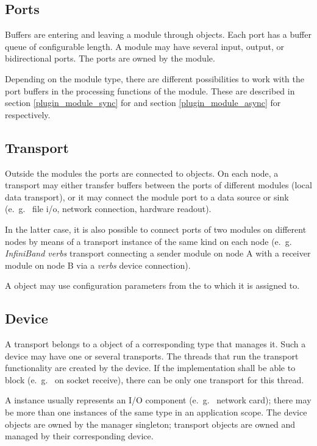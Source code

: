       
\subsection{Ports}
Buffers are entering and leaving a module through 
  objects. 
Each port has a buffer queue of configurable length.
A module may have several input, output,  
or bidirectional ports. The ports are owned by the module.

Depending on the module type, there are different possibilities to
work with the port buffers in the processing functions of the module.
These are described in section \ref{plugin_module_sync} for 
and section \ref{plugin_module_async} for  respectively.
 



\subsection{Transport}
Outside the modules the ports are connected to 
  objects.
On each node, a transport may either transfer buffers between 
the ports of different modules (local data transport), or it may connect the module port to a data 
source or sink (e.~g.~ file i/o, network connection, hardware readout).

In the latter case, it is also possible  to connect ports of two modules on 
different nodes by means of a transport instance of the same kind on 
each node (e.~g.~ {\em InfiniBand verbs} transport connecting a sender module on node A with a receiver
module on node B via a {\em verbs} device connection).

A  object may use configuration parameters from the 
 to which it is assigned to.

\subsection{Device}
A transport belongs to a  
 object of a 
corresponding type that manages it. Such a device may have one or several transports.  
The threads that run the transport functionality are
created by the device. If the  implementation 
shall be able to block (e.~g.~ on socket receive), there can be only 
one transport for this thread. 

A  instance usually represents an I/O component (e.~g.~ network card); 
there may be more than one  instances of the same 
type in an application scope. 
The device objects are owned by the manager 
singleton; transport objects are owned and managed by their corresponding device.  

